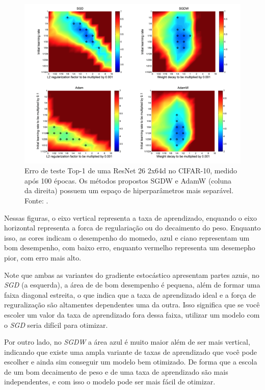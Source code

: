 \begin{figure}[h]
    \centering
    \includegraphics[width=1\linewidth]{../imagens/retropropagacao-gradiente/comparativo-adamw-cifar-10.png}
    
    \caption[Erro de teste Top-1 da ResNet no CIFAR-10]{%
        Erro de teste Top-1 de uma ResNet 26 2x64d no CIFAR-10, medido após 100 épocas. Os métodos propostos SGDW e AdamW (coluna da direita) possuem um espaço de hiperparâmetros mais separável.
        \newline
        \small Fonte: \parencite{AdamWMethod}.
    }
    \label{fig:comparativo-adamw-cifar-10}
\end{figure}

Nessas figuras, o eixo vertical representa a taxa de aprendizado, enquando o eixo horizontal representa a forca de regulariação ou do decaimento do peso. Enquanto isso, as cores indicam o desempenho do momedo, azul e ciano representam um bom desempenho, com baixo erro, enquanto vermelho representa um desemepho pior, com erro mais alto.

Note que ambas as variantes do gradiente estocástico apresentam partes azuis, no \textit{SGD} (a esquerda), a área de de bom desempenho é pequena, além de formar uma faixa diagonal estreita, o que indica que a taxa de aprendizado ideal e a força de reguralização são altamentes dependentes uma da outra. Isso significa que se você escoler um valor da taxa de aprendizado fora dessa faixa, utilizar um modelo com o \textit{SGD} seria difícil para otimizar.

Por outro lado, no \textit{SGDW} a área azul é muito maior além de ser mais vertical, indicando que existe uma ampla variante de taxas de aprendizado que você pode escolher e ainda sim conseguir um modelo bem otimizado. De forma que a escola de um bom decaimento de peso e de uma taxa de aprendizado são mais independentes, e com isso o modelo pode ser mais fácil de otimizar.

